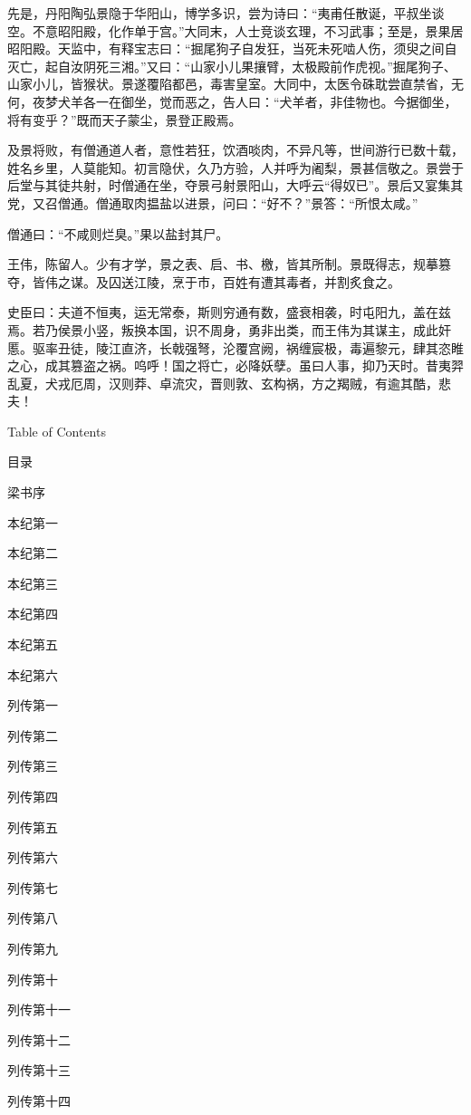 \documentclass[12pt,UTF8]{ctexbook}
\begin{document}
先是，丹阳陶弘景隐于华阳山，博学多识，尝为诗曰：“夷甫任散诞，平叔坐谈空。不意昭阳殿，化作单于宫。”大同末，人士竞谈玄理，不习武事；至是，景果居昭阳殿。天监中，有释宝志曰：“掘尾狗子自发狂，当死未死啮人伤，须臾之间自灭亡，起自汝阴死三湘。”又曰：“山家小儿果攘臂，太极殿前作虎视。”掘尾狗子、山家小儿，皆猴状。景遂覆陷都邑，毒害皇室。大同中，太医令硃耽尝直禁省，无何，夜梦犬羊各一在御坐，觉而恶之，告人曰：“犬羊者，非佳物也。今据御坐，将有变乎？”既而天子蒙尘，景登正殿焉。

及景将败，有僧通道人者，意性若狂，饮酒啖肉，不异凡等，世间游行已数十载，姓名乡里，人莫能知。初言隐伏，久乃方验，人并呼为阇梨，景甚信敬之。景尝于后堂与其徒共射，时僧通在坐，夺景弓射景阳山，大呼云“得奴已”。景后又宴集其党，又召僧通。僧通取肉揾盐以进景，问曰：“好不？”景答：“所恨太咸。”

僧通曰：“不咸则烂臭。”果以盐封其尸。

王伟，陈留人。少有才学，景之表、启、书、檄，皆其所制。景既得志，规摹篡夺，皆伟之谋。及囚送江陵，烹于市，百姓有遭其毒者，并割炙食之。

史臣曰：夫道不恒夷，运无常泰，斯则穷通有数，盛衰相袭，时屯阳九，盖在兹焉。若乃侯景小竖，叛换本国，识不周身，勇非出类，而王伟为其谋主，成此奸慝。驱率丑徒，陵江直济，长戟强弩，沦覆宫阙，祸缠宸极，毒遍黎元，肆其恣睢之心，成其篡盗之祸。呜呼！国之将亡，必降妖孽。虽曰人事，抑乃天时。昔夷羿乱夏，犬戎厄周，汉则莽、卓流灾，晋则敦、玄构祸，方之羯贼，有逾其酷，悲夫！

Table of Contents

目录

梁书序

本纪第一

本纪第二

本纪第三

本纪第四

本纪第五

本纪第六

列传第一

列传第二

列传第三

列传第四

列传第五

列传第六

列传第七

列传第八

列传第九

列传第十

列传第十一

列传第十二

列传第十三

列传第十四
\end{document}

